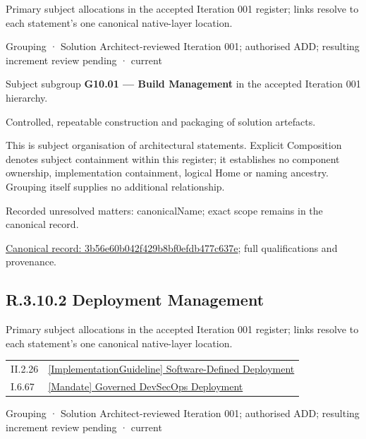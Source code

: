 Primary subject allocations in the accepted Iteration 001 register; links resolve to each statement’s one canonical native-layer location.\par
\label{element:3b56e60b042f429b8bf0efdb477c637e}
{\small Grouping · Solution Architect-reviewed Iteration 001; authorised ADD; resulting increment review pending · current}\par

Subject subgroup \textbf{G10.01 — Build Management} in the accepted Iteration 001 hierarchy.



Controlled, repeatable construction and packaging of solution artefacts.



This is subject organisation of architectural statements. Explicit Composition denotes subject containment within this register; it establishes no component ownership, implementation containment, logical Home or naming ancestry. Grouping itself supplies no additional relationship.


{\small Recorded unresolved matters: canonicalName; exact scope remains in the canonical record.}\par
{\footnotesize \href{../../../../continuum/grouping/3b56e60b042f429b8bf0efdb477c637e.md}{Canonical record: 3b56e60b042f429b8bf0efdb477c637e}; full qualifications and provenance.}\par
\subsection*{R.3.10.2 Deployment Management}
\label{navigation:R.3.10.2}

Primary subject allocations in the accepted Iteration 001 register; links resolve to each statement’s one canonical native-layer location.\par
\begin{longtable}{p{.22\linewidth}p{.73\linewidth}}
II.2.26 & \hyperref[element:1ad8342e9ffd43138b27be348e861a77]{[ImplementationGuideline] Software-Defined Deployment} \\
I.6.67 & \hyperref[element:54eb7e671c094ebcbb5503af36c7892d]{[Mandate] Governed DevSecOps Deployment} \\
\end{longtable}
\label{element:36264352a7f745109deaac2025877690}
{\small Grouping · Solution Architect-reviewed Iteration 001; authorised ADD; resulting increment review pending · current}\par

